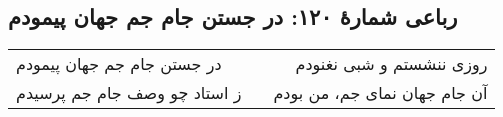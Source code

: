 \begin{center}
\section*{رباعی شمارهٔ ۱۲۰: در جستن جام جم جهان پیمودم}
\label{sec:120}
\begin{longtable}{l p{0.5cm} r}
در جستن جام جم جهان پیمودم
&&
روزی ننشستم و شبی نغنودم
\\
ز استاد چو وصف جام جم پرسیدم
&&
آن جام جهان نمای جم، من بودم
\\
\end{longtable}
\end{center}
